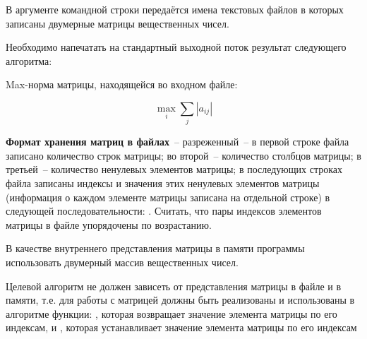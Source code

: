 
В аргументе командной строки передаётся имена текстовых файлов
в которых записаны двумерные матрицы
вещественных чисел.

Необходимо напечатать на стандартный выходной
поток результат следующего алгоритма:

Max-норма матрицы, находящейся во входном файле:

$$
\max_i{\sum_j{|a_{ij}|}}
$$

\textbf{Формат хранения матриц в файлах}~--
разреженный~-- в первой строке файла записано количество строк
матрицы; во второй~-- количество столбцов матрицы; в третьей~--
количество ненулевых элементов матрицы; в последующих строках
файла записаны индексы и значения этих ненулевых элементов
матрицы (информация о каждом элементе матрицы записана на
отдельной строке) в следующей последовательности: 
 . Считать, что пары индексов
элементов матрицы в файле упорядочены по возрастанию.

В качестве внутреннего представления матрицы в памяти программы
использовать двумерный массив вещественных чисел.

Целевой алгоритм не
должен зависеть от представления матрицы в файле и в памяти, т.е. для
работы с матрицей должны быть реализованы и использованы в алгоритме
функции: , которая возвращает
значение элемента матрицы по его индексам, и , которая устанавливает значение элемента
матрицы по его индексам
